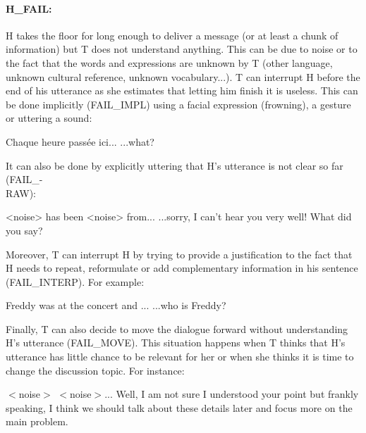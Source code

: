         \paragraph{H\_FAIL:} H takes the floor for long enough to deliver a message (or at least a chunk of information) but T does not understand anything. This can be due to noise or to the fact that the words and expressions are unknown by T (other language, unknown cultural reference, unknown vocabulary...). T can interrupt H before the end of his utterance as she estimates that letting him finish it is useless. This can be done implicitly (FAIL\_IMPL) using a facial expression (frowning), a gesture or uttering a sound:
				
					\begin{dialogue}
						 Chaque heure pass\'ee ici...
						 ...what?
					\end{dialogue}
					
					It can also be done by explicitly uttering that H's utterance is not clear so far (FAIL\_-\\RAW):
					
					\begin{dialogue}
						 <noise> has been <noise> from...
						 ...sorry, I can't hear you very well! What did you say?
					\end{dialogue}
					
					Moreover, T can interrupt H by trying to provide a justification to the fact that H needs to repeat, reformulate or add complementary information in his sentence (FAIL\_INTERP). For example:
					
					\begin{dialogue}
						 Freddy was at the concert and ...
						 ...who is Freddy?
					\end{dialogue}

                                        Finally, T can also decide to move the dialogue forward without understanding H's utterance (FAIL\_MOVE). This situation happens when T thinks that H's utterance has little chance to be relevant for her or when she thinks it is time to change the discussion topic. For instance:

                                        \begin{dialogue}
                                           $<$noise$>$ $<$noise$>$...
                                           Well, I am not sure I understood your point but frankly speaking, I think we should talk about these details later and focus more on the main problem.
                                        \end{dialogue}
					
